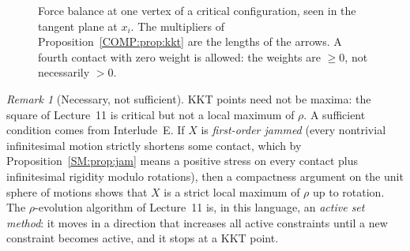 \documentclass[11pt,openany]{book}
\theoremstyle{plain}
\theoremstyle{definition}
\theoremstyle{remark}
\newtheorem{remark}[theorem]{Remark}
\begin{document}
\begin{figure}[ht]
\centering
{}
\caption{Force balance at one vertex of a critical configuration, seen in the tangent plane at $x_i$. The
multipliers of Proposition~\ref{COMP:prop:kkt} are the lengths of the arrows. A fourth contact with zero
weight is allowed: the weights are $\ge0$, not necessarily $>0$.}
\label{COMP:fig:forces}
\end{figure}

\begin{remark}[Necessary, not sufficient]
KKT points need not be maxima: the square of Lecture~11 is critical but not a local maximum of $\rho$. A
sufficient condition comes from Interlude~E. If $X$ is \emph{first-order jammed} (every nontrivial
infinitesimal motion strictly shortens some contact, which by Proposition~\ref{SM:prop:jam} means a positive
stress on every contact plus infinitesimal rigidity modulo rotations), then a compactness argument on the
unit sphere of motions shows that $X$ is a strict local maximum of $\rho$ up to rotation. The
$\rho$-evolution algorithm of Lecture~11 is, in this language, an \emph{active set method}: it moves in a
direction that increases all active constraints until a new constraint becomes active, and it stops at a
KKT point.
\end{remark}
\end{document}
